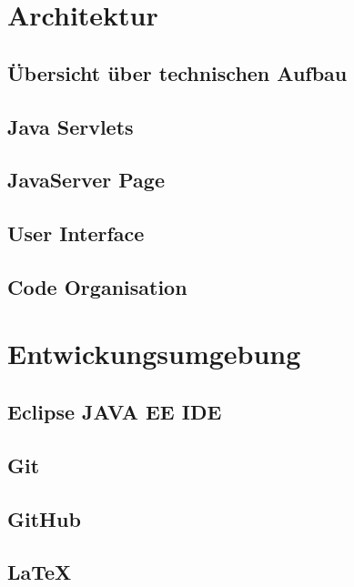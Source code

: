 \clearpage
\chapter{Architektur}
\section{Übersicht über technischen Aufbau}
\section{Java Servlets}
\section{JavaServer Page}
\section{User Interface}
\section{Code Organisation}

\chapter{Entwickungsumgebung}
\section{Eclipse JAVA EE IDE}
\section{Git}
\section{GitHub}
\section{LaTeX}

